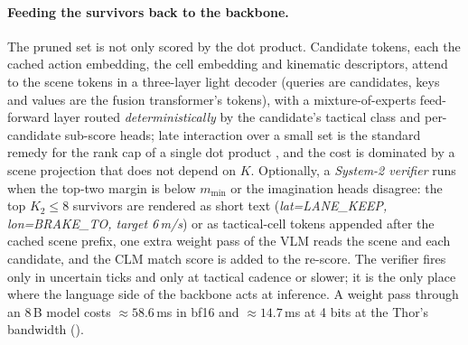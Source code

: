 \paragraph{Feeding the survivors back to the backbone.}
The pruned set is not only scored by the dot product. Candidate tokens, each the cached action embedding, the cell embedding and kinematic descriptors, attend to the scene tokens in a three-layer light decoder (queries are candidates, keys and values are the fusion transformer's tokens), with a mixture-of-experts feed-forward layer routed \emph{deterministically} by the candidate's tactical class and per-candidate sub-score heads; late interaction over a small set is the standard remedy for the rank cap of a single dot product \citep{weller2025limits,khattab2020colbert}, and the cost is dominated by a scene projection that does not depend on $K$.
Optionally, a \emph{System-2 verifier} runs when the top-two margin is below $m_{\min}$ or the imagination heads disagree: the top $K_2\le8$ survivors are rendered as short text (\emph{lat=LANE\_KEEP, lon=BRAKE\_TO, target 6\,m/s}) or as tactical-cell tokens appended after the cached scene prefix, one extra weight pass of the VLM reads the scene and each candidate, and the CLM match score is added to the re-score.
The verifier fires only in uncertain ticks and only at tactical cadence or slower; it is the only place where the language side of the backbone acts at inference. A weight pass through an 8\,B model costs $\approx58.6$\,ms in bf16 and $\approx14.7$\,ms at 4 bits at the Thor's bandwidth (\evE).
